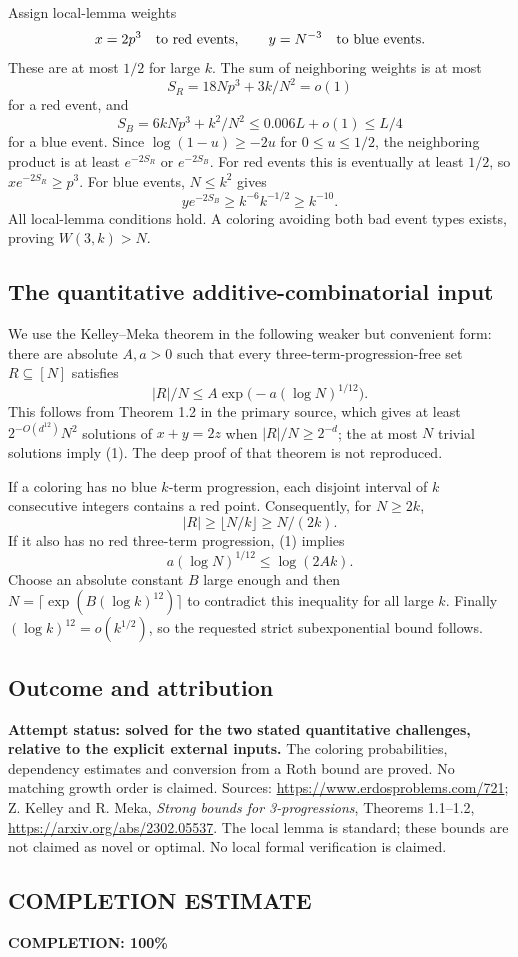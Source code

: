 Assign local-lemma weights
\[
 x=2p^3\quad\hbox{to red events},\qquad y=N^{-3}\quad\hbox{to blue events}.
\]
These are at most $1/2$ for large $k$. The sum of neighboring weights is at most
\[
 S_R=18Np^3+3k/N^2=o(1)
\]
for a red event, and
\[
 S_B=6kNp^3+k^2/N^2
 \leq0.006L+o(1)\leq L/4
\]
for a blue event. Since $\log(1-u)\geq-2u$ for $0\leq u\leq1/2$, the neighboring product is at least $e^{-2S_R}$ or $e^{-2S_B}$.
For red events this is eventually at least $1/2$, so $x e^{-2S_R}\geq p^3$. For blue events, $N\leq k^2$ gives
\[
 y e^{-2S_B}\geq k^{-6}k^{-1/2}\geq k^{-10}.
\]
All local-lemma conditions hold. A coloring avoiding both bad event types exists, proving $W(3,k)>N$.

\subsection*{The quantitative additive-combinatorial input}
We use the Kelley--Meka theorem in the following weaker but convenient form: there are absolute $A,a>0$ such that every three-term-progression-free set $R\subseteq[N]$ satisfies
\[
 |R|/N\leq A\exp\bigl(-a(\log N)^{1/12}\bigr). \tag{1}
\]
This follows from Theorem 1.2 in the primary source, which gives at least $2^{-O(d^{12})}N^2$ solutions of $x+y=2z$ when $|R|/N\geq2^{-d}$; the at most $N$ trivial solutions imply (1). The deep proof of that theorem is not reproduced.

If a coloring has no blue $k$-term progression, each disjoint interval of $k$ consecutive integers contains a red point. Consequently, for $N\geq2k$,
\[
 |R|\geq\lfloor N/k\rfloor\geq N/(2k).
\]
If it also has no red three-term progression, (1) implies
\[
 a(\log N)^{1/12}\leq\log(2Ak).
\]
Choose an absolute constant $B$ large enough and then $N=\lceil\exp(B(\log k)^{12})\rceil$ to contradict this inequality for all large $k$. Finally $(\log k)^{12}=o(k^{1/2})$, so the requested strict subexponential bound follows.

\subsection*{Outcome and attribution}
\textbf{Attempt status: solved for the two stated quantitative challenges, relative to the explicit external inputs.} The coloring probabilities, dependency estimates and conversion from a Roth bound are proved. No matching growth order is claimed.
Sources: \url{https://www.erdosproblems.com/721}; Z. Kelley and R. Meka, \emph{Strong bounds for 3-progressions}, Theorems 1.1--1.2, \url{https://arxiv.org/abs/2302.05537}. The local lemma is standard; these bounds are not claimed as novel or optimal. No local formal verification is claimed.

\subsection*{COMPLETION ESTIMATE}
\textbf{COMPLETION: 100\%}
